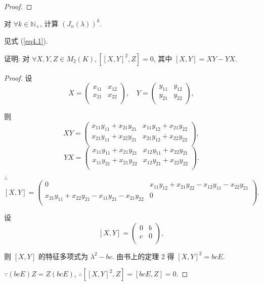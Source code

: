 \documentclass[color=black,device=normal,lang=cn,mode=geye]{elegantnote}
\begin{document}
\begin{proof}
\end{proof}
\begin{exercise}%
    对 $\forall k\in\mathbb{N}_+$, 计算 $(J_n(\lambda))^k$.
\end{exercise}
\begin{solution}
    见式 (\ref{eq4.1}).
\end{solution}
\begin{exercise}%
    证明: 对 $\forall X,Y,Z\in M_2(K),[[X,Y]^2,Z]=0$, 其中 $[X,Y]=XY-YX$.
\end{exercise}
\begin{proof}
    设
    \[X=\begin{pmatrix}
        x_{11} & x_{12} \\
        x_{21} & x_{22} \\
    \end{pmatrix},\quad Y=\begin{pmatrix}
        y_{11} & y_{12} \\
        y_{21} & y_{22} \\
    \end{pmatrix},\]

    则
    \[XY=\begin{pmatrix}
        x_{11}y_{11}+x_{21}y_{21} & x_{11}y_{12}+x_{21}y_{22} \\
        x_{21}y_{11}+x_{22}y_{21} & x_{21}y_{12}+x_{22}y_{22} \\
    \end{pmatrix},\]
    \[YX=\begin{pmatrix}
        x_{11}y_{11}+x_{21}y_{21} & x_{12}y_{11}+x_{22}y_{21} \\
        x_{11}y_{21}+x_{21}y_{22} & x_{12}y_{21}+x_{22}y_{22} \\
    \end{pmatrix}.\]

    $\therefore$
    \[[X,Y]=\begin{pmatrix}
        0 & x_{11}y_{12}+x_{21}y_{22}-x_{12}y_{11}-x_{22}y_{21} \\
        x_{21}y_{11}+x_{22}y_{21}-x_{11}y_{21}-x_{21}y_{22} & 0 \\
    \end{pmatrix}.\]

    设
    \[[X,Y]=\begin{pmatrix}
        0 & b \\
        c & 0 \\
    \end{pmatrix},\]

    则 $[X,Y]$ 的特征多项式为 $\lambda^2-bc$. 由书上的定理 2 得 $[X,Y]^2=bcE$.

    $\because (bcE)Z=Z(bcE)$, $\therefore[[X,Y]^2,Z]=[bcE,Z]=0$.
\end{proof}
\end{document}
